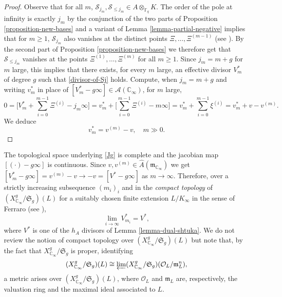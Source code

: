 \documentclass[11pt]{amsart}
\numberwithin{equation}{section}
\newcommand{\FF}{\mathbb{F}}
\newcommand{\CC}{\mathbb{C}}
\begin{document}
\begin{proof}
Observe that for all $m$, $\mathcal{S}_{j_m},\mathcal{S}_{\leq j_m}\in A\otimes_{\FF_q} K$. The order of the pole at infinity is exactly $j_m$ by the conjunction of the two parts of Proposition \ref{proposition-new-bases} and a variant of Lemma \ref{lemma-partial-negative} implies that for $m\geq1$, $\mathcal{S}_{j_m}$ also vanishes at the distinct points $\Xi,\ldots,\Xi^{(m-1)}$ (see \cite[Lemma 2.1]{CHU&NGO&PEL}). By the second part of Proposition \ref{proposition-new-bases} we therefore get that $\mathcal{S}_{\leq j_m}$ vanishes at the points
$\Xi^{(1)},\ldots,\Xi^{(m)}$ for all $m\geq1$. Since $j_m=m+g$ for $m$ large, this implies that there exists, for every $m$ large,
an effective divisor $V^*_m$ of degree $g$ such that \eqref{divisor-of-Sj} holds.
Compute, when $j_m=m+g$ and writing $v^*_m$ in place of $[V^*_m-g\infty]\in\mathcal{A}(\CC_\infty)$, for $m$ large,
$$0=\Big[V^*_m+\sum_{i=0}^{m-1}\Xi^{(i)}-j_m\infty\Big]=v^*_m+\Big[\sum_{i=0}^{m-1}\Xi^{(i)}-m\infty\Big]=v^*_m+\sum_{i=0}^{m-1}\xi^{(i)}=v^*_m+v-v^{(m)}.$$
We deduce $$v^*_m=v^{(m)}-v,\quad m\gg0.$$
\end{proof}
The topological space underlying \eqref{Jg} is complete and the jacobian map $[(\cdot)-g\infty]$ is continuous. Since $v,v^{(m)}\in\widehat{A}(\mathfrak{m}_{\CC_\infty})$ we get
$[V^*_m-g\infty]=v^{(m)}-v\rightarrow -v=[V^*-g\infty]$ as $m\rightarrow\infty$. Therefore, over a strictly increasing subsequence $(m_i)_i$ and in the {\em compact topology} of $(X_{\CC_\infty}^g/\mathfrak{S}_g)(L)$ for a suitably chosen finite extension $L/K_\infty$ in the sense of Ferraro (see \cite[Definition 3.3]{FER1}),
\begin{equation}\label{limit-V-star-m}
\lim_{i\rightarrow\infty}V^*_{m_i}=V^*,
\end{equation}
where $V^*$ is one of the $h_A$ divisors of Lemma \ref{lemma-dual-shtuka}. We do not review the notion of compact topology over $(X_{\CC_\infty}^g/\mathfrak{S}_g)(L)$ but note that, by the fact that $X_{\CC_\infty}^g/\mathfrak{S}_g$ is proper, identifying
$$(X_{\CC_\infty}^g/\mathfrak{S}_g)(L)\cong\varprojlim(X_{\CC_\infty}^g/\mathfrak{S}_g)(\mathcal{O}_L/\mathfrak{m}_L^n),$$
a metric arises over $(X_{\CC_\infty}^g/\mathfrak{S}_g)(L)$, where $\mathcal{O}_L$ and $\mathfrak{m}_L$ are, respectively,
the valuation ring and the maximal ideal associated to $L$.
\end{document}
